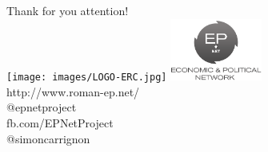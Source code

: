 \documentclass[12pt, notes=show]{beamer}
\begin{document}
\begin{frame}
	\begin{center}
		Thank for you attention!\\
		\texttt{[image: images/LOGO-ERC.jpg]} \hfil	\includegraphics[width=3cm]{../../logos/epnetLogo.png}\\
		\vspace{1cm}
		\scriptsize
			http://www.roman-ep.net/\\
			@epnetproject\\
			fb.com/EPNetProject\\
			@simoncarrignon
	\end{center}


\end{frame}
\end{document}
